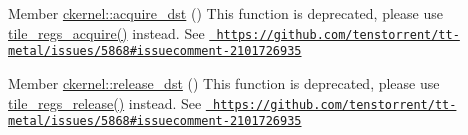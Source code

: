 
\begin{DoxyRefList}
\item[Member \mbox{\hyperlink{namespaceckernel_ab3e5c0b33fb9768ebd6a7649dca13d56}{ckernel\+::acquire\+\_\+dst}} ()]\label{deprecated__deprecated000001}%
%
This function is deprecated, please use {\ttfamily \mbox{\hyperlink{namespaceckernel_a34467f46da4221ff3a2820ff1baec122}{tile\+\_\+regs\+\_\+acquire()}}} instead. See \href{https://github.com/tenstorrent/tt-metal/issues/5868\#issuecomment-2101726935}{\texttt{ https\+://github.\+com/tenstorrent/tt-\/metal/issues/5868\#issuecomment-\/2101726935}} 
\item[Member \mbox{\hyperlink{namespaceckernel_aca8a1c47b441f374e4ad21ed8d2f8a4e}{ckernel\+::release\+\_\+dst}} ()]\label{deprecated__deprecated000002}%
%
This function is deprecated, please use {\ttfamily \mbox{\hyperlink{namespaceckernel_addd3679665da343bd51f76ced7154c4a}{tile\+\_\+regs\+\_\+release()}}} instead. See \href{https://github.com/tenstorrent/tt-metal/issues/5868\#issuecomment-2101726935}{\texttt{ https\+://github.\+com/tenstorrent/tt-\/metal/issues/5868\#issuecomment-\/2101726935}}
\end{DoxyRefList}